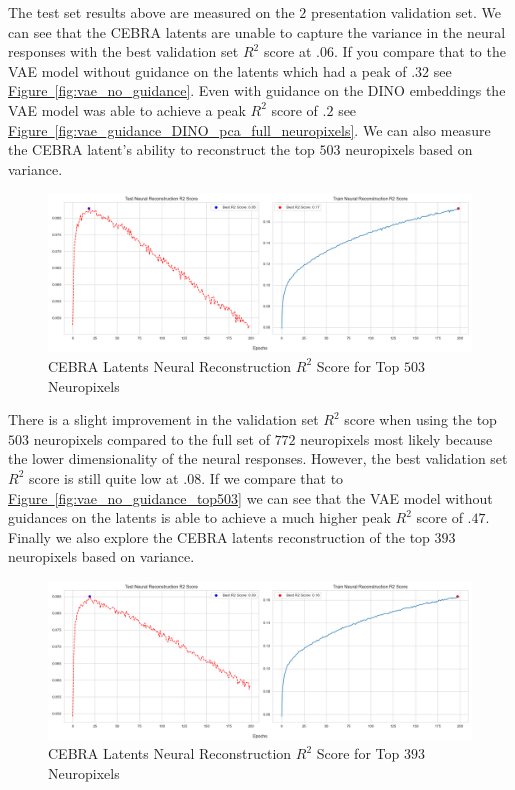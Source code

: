 \documentclass[12pt, letterpaper]{article}
\begin{document}
The test set results above are measured on the $2$ presentation validation set. We can see that the CEBRA \cite{schneider2023} latents are unable to capture the variance in the neural responses with the best validation set $R^2$ score at $.06$. If you compare that to the VAE model without guidance on the latents which had a peak of $.32$ see \hyperref[fig:vae_no_guidance]{Figure~\ref{fig:vae_no_guidance}}. Even with guidance on the DINO \cite{dino} embeddings the VAE model was able to achieve a peak $R^2$ score of $.2$ see \hyperref[fig:vae_guidance_DINO_pca_full_neuropixels]{Figure~\ref{fig:vae_guidance_DINO_pca_full_neuropixels}}. We can also measure the CEBRA \cite{schneider2023} latent's ability to reconstruct the top $503$ neuropixels based on variance.

\begin{figure}[H]
    \centering
    \includegraphics[width=1.0\textwidth]{cebra_x_r2_503_200_epochs_3_layer.png}
    \caption{CEBRA Latents Neural Reconstruction $R^2$ Score for Top $503$ Neuropixels}
    \label{fig:cebra_latents_neural_reconstruction_503}
\end{figure}

There is a slight improvement in the validation set $R^2$ score when using the top $503$ neuropixels compared to the full set of $772$ neuropixels most likely because the lower dimensionality of the neural responses. However, the best validation set $R^2$ score is still quite low at $.08$. If we compare that to \hyperref[fig:vae_no_guidance_top503]{Figure~\ref{fig:vae_no_guidance_top503}} we can see that the VAE model without guidances on the latents is able to achieve a much higher peak $R^2$ score of $.47$. Finally we also explore the CEBRA \cite{schneider2023} latents reconstruction of the top $393$ neuropixels based on variance.

\begin{figure}[H]
    \centering
    \includegraphics[width=1.0\textwidth]{cebra_x_r2_393_200_epochs_3_layer.png}
    \caption{CEBRA Latents Neural Reconstruction $R^2$ Score for Top $393$ Neuropixels}
    \label{fig:cebra_latents_neural_reconstruction_393}
\end{figure}
\end{document}
